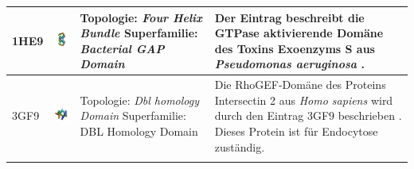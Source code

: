 \documentclass{report}
\begin{document}
\begin{table}
\begin{center}
\begin{tabular}{ | C{9mm} | C{30mm} | C{29mm} | C{38mm} | }
1HE9  & \includegraphics[width=30mm, trim= -10 -5 -5 -10]{1HE9_bio_r_500.jpg}  & Topologie: \newline \textit{Four Helix Bundle} \newline Superfamilie: \newline \textit{Bacterial GAP Domain}   & Der Eintrag beschreibt die GTPase aktivierende Dom\"ane des Toxins Exoenzyms S aus \textit{Pseudomonas aeruginosa} \cite{1he9}. \\ \hline
3GF9  & \includegraphics[width=30mm, trim= -10 -5 -5 -10]{3GF9_bio_r_500.jpg} & Topologie: \newline \textit{Dbl homology Domain} \newline Superfamilie: \newline DBL Homology Domain & Die RhoGEF-Dom\"ane des  Proteins Intersectin 2 aus \textit{Homo sapiens} wird durch den Eintrag 3GF9 beschrieben \cite{3gf9}. Dieses Protein ist f\"ur Endocytose zust\"andig. \\ 
\hline
\label{tab:occ_alpha}
\end{tabular}
\end{center}

\end{table}
\end{document}
